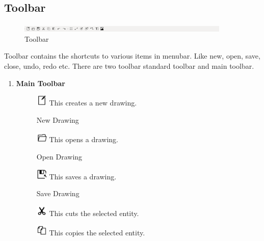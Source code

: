 \subsection{Toolbar}
\begin{figure}[h!]
\centering
\includegraphics[width=0.9\textwidth]{images/toolbar.png}
\caption{Toolbar}
\end{figure}
Toolbar contains the shortcuts to various items in menubar. Like new, open, save, close, undo, redo etc. There are two toolbar standard toolbar and main toolbar.
\begin{enumerate}
\item \textbf{Main Toolbar}
\begin{figure}[h!]
\includegraphics[width=0.05\textwidth]{images/newDrawing.jpg} 
This creates a new drawing.
\caption{New Drawing}
\end{figure}
\begin{figure}[h!]
\includegraphics[width=0.05\textwidth]{images/openDrawing.jpg} 
This opens a drawing.
\caption{Open Drawing}
\end{figure}
\begin{figure}[h!]
\includegraphics[width=0.05\textwidth]{images/saveDrawing.jpg} 
This saves a drawing.
\caption{Save Drawing}
\end{figure}
\begin{figure}[h!]
\includegraphics[width=0.05\textwidth]{images/cut.jpg} 
This cuts the selected entity.
\end{figure}
\begin{figure}[h!]
\includegraphics[width=0.05\textwidth]{images/copy.jpg} 
This copies the selected entity.
\end{figure}
\begin{figure}[h!]

\end{figure}
\end{enumerate}
